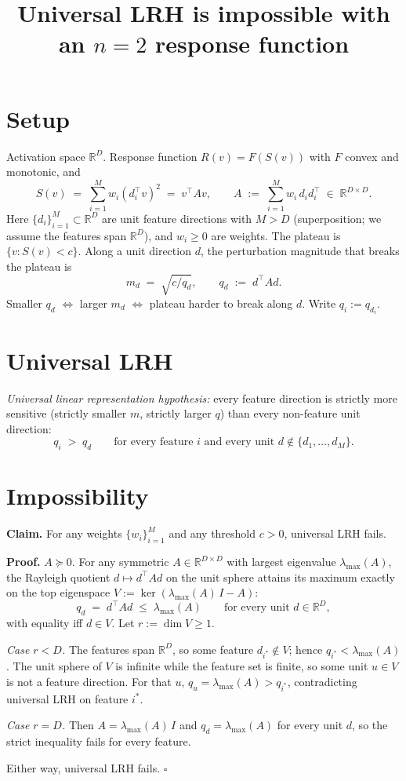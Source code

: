 \documentclass[11pt]{article}
\title{Universal LRH is impossible with an $n=2$ response function}
\author{}
\date{}
\newcommand{\RR}{\mathbb{R}}
\begin{document}
\maketitle

\section{Setup}

Activation space $\RR^D$. Response function $R(v) = F(S(v))$ with $F$ convex and monotonic, and
\[
  S(v) \;=\; \sum_{i=1}^M w_i (d_i^\top v)^2 \;=\; v^\top A v,
  \qquad A \;:=\; \sum_{i=1}^M w_i\, d_i d_i^\top \;\in\; \RR^{D\times D}.
\]
Here $\{d_i\}_{i=1}^M \subset \RR^D$ are unit feature directions with $M > D$ (superposition; we assume the features span $\RR^D$), and $w_i \ge 0$ are weights. The plateau is $\{v : S(v) < c\}$. Along a unit direction $d$, the perturbation magnitude that breaks the plateau is
\[
  m_d \;=\; \sqrt{c/q_d}, \qquad q_d \;:=\; d^\top A d.
\]
Smaller $q_d$ $\Leftrightarrow$ larger $m_d$ $\Leftrightarrow$ plateau harder to break along $d$. Write $q_i := q_{d_i}$.

\section{Universal LRH}

\emph{Universal linear representation hypothesis:} every feature direction is strictly more sensitive (strictly smaller $m$, strictly larger $q$) than every non-feature unit direction:
\[
  q_i \;>\; q_d \qquad \text{for every feature $i$ and every unit $d \notin \{d_1,\dots,d_M\}$.}
\]

\section{Impossibility}

\textbf{Claim.} For any weights $\{w_i\}_{i=1}^M$ and any threshold $c > 0$, universal LRH fails.

\textbf{Proof.} $A \succeq 0$. For any symmetric $A \in \RR^{D\times D}$ with largest eigenvalue $\lambda_{\max}(A)$, the Rayleigh quotient $d \mapsto d^\top A d$ on the unit sphere attains its maximum exactly on the top eigenspace $V := \ker(\lambda_{\max}(A)\, I - A)$:
\[
  q_d \;=\; d^\top A d \;\le\; \lambda_{\max}(A) \qquad \text{for every unit } d \in \RR^D,
\]
with equality iff $d \in V$. Let $r := \dim V \ge 1$.

\emph{Case $r < D$.} The features span $\RR^D$, so some feature $d_{i^*} \notin V$; hence $q_{i^*} < \lambda_{\max}(A)$. The unit sphere of $V$ is infinite while the feature set is finite, so some unit $u \in V$ is not a feature direction. For that $u$, $q_u = \lambda_{\max}(A) > q_{i^*}$, contradicting universal LRH on feature $i^*$.

\emph{Case $r = D$.} Then $A = \lambda_{\max}(A)\, I$ and $q_d = \lambda_{\max}(A)$ for every unit $d$, so the strict inequality fails for every feature.

Either way, universal LRH fails. $\square$
\end{document}
